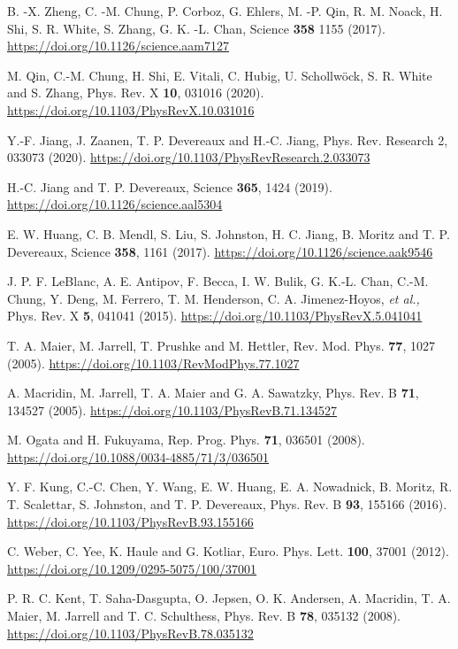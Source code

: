 \documentclass[reprint,nofootinbib,nobibnotes,amsmath,amssymb,aps,prb,floatfix]{revtex4-2}
\begin{document}
\begin{thebibliography}{99}
 B. -X. Zheng, C. -M. Chung, P. Corboz, G. Ehlers, M. -P. Qin, R. M. Noack, H. Shi, S. R. White, S. Zhang, G. K. -L. Chan, Science {\bf 358} 1155 (2017). \url{https://doi.org/10.1126/science.aam7127}

 M. Qin, C.-M. Chung, H. Shi, E. Vitali, C. Hubig, U. Schollw\"ock, S. R. White and S. Zhang, Phys. Rev. X {\bf 10}, 031016 (2020). \url{https://doi.org/10.1103/PhysRevX.10.031016}

 Y.-F. Jiang, J. Zaanen, T. P. Devereaux and H.-C. Jiang,  Phys. Rev. Research 2, 033073 (2020). \url{https://doi.org/10.1103/PhysRevResearch.2.033073}

 H.-C. Jiang and T. P. Devereaux, Science {\bf 365}, 1424 (2019). 
\url{https://doi.org/10.1126/science.aal5304}

 E. W. Huang, C. B. Mendl, S. Liu, S. Johnston, H. C. Jiang, B. Moritz and T. P. Devereaux, Science {\bf 358}, 1161 (2017). \url{https://doi.org/10.1126/science.aak9546}

 J. P. F. LeBlanc, A. E. Antipov, F. Becca, I. W. Bulik, G. K.-L. Chan, C.-M. Chung, Y. Deng, M. Ferrero, T. M. Henderson, C. A. Jimenez-Hoyos, {\it et al.,} Phys. Rev. X {\bf 5}, 041041  (2015). \url{https://doi.org/10.1103/PhysRevX.5.041041}

 T. A. Maier, M. Jarrell, T. Prushke and M. Hettler, Rev. Mod. Phys. {\bf 77}, 1027 (2005). \url{https://doi.org/10.1103/RevModPhys.77.1027}

 A. Macridin, M. Jarrell, T. A. Maier and G. A. Sawatzky, Phys. Rev. B {\bf 71}, 134527 (2005). \url{https://doi.org/10.1103/PhysRevB.71.134527}

 M. Ogata and H. Fukuyama, Rep. Prog. Phys. {\bf 71}, 036501 (2008). 
\url{https://doi.org/10.1088/0034-4885/71/3/036501}

 Y. F. Kung, C.-C. Chen, Y. Wang, E. W. Huang, E. A. Nowadnick, B. Moritz, R. T. Scalettar, S. Johnston, and T. P. Devereaux, Phys. Rev. B {\bf 93}, 155166 (2016). \url{https://doi.org/10.1103/PhysRevB.93.155166}

 C. Weber, C. Yee, K. Haule and G. Kotliar, Euro. Phys. Lett. {\bf 100}, 37001 (2012). \url{https://doi.org/10.1209/0295-5075/100/37001}

 P. R. C. Kent, T. Saha-Dasgupta, O. Jepsen, O. K. Andersen, A. Macridin, T. A. Maier, M. Jarrell and T. C. Schulthess, Phys. Rev. B {\bf 78}, 035132 (2008). \url{https://doi.org/10.1103/PhysRevB.78.035132}


\end{thebibliography}
\end{document}
